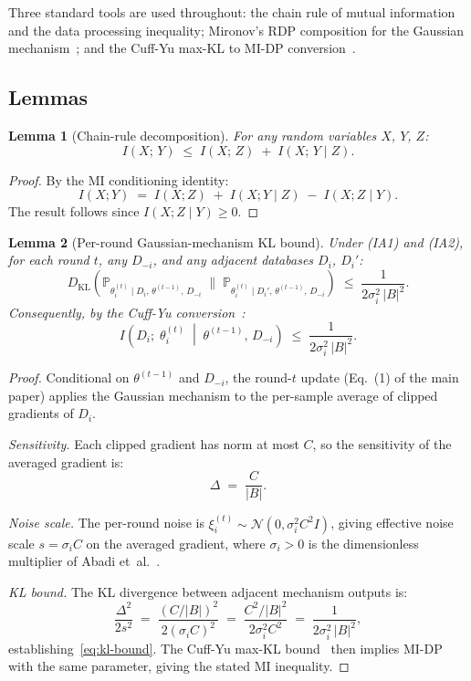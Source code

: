 \documentclass[letterpaper,journal]{IEEEtran}
\newtheorem{lemma}{Lemma}[section]
\newcommand{\KL}{D_{\mathrm{KL}}}
\begin{document}
\noindent Three standard tools are used throughout: the chain rule of
mutual information and the data processing inequality;
Mironov's RDP composition for the Gaussian
mechanism~\cite{mironov2017rdp}; and the Cuff-Yu max-KL to
MI-DP conversion~\cite{cuff2016mi}.

\subsection{Lemmas}

\begin{lemma}[Chain-rule decomposition]
\label{lem:chain}
For any random variables $X$, $Y$, $Z$:
\[
I(X;\,Y) \;\leq\; I(X;\,Z) \;+\; I(X;\,Y \mid Z).
\]
\end{lemma}

\begin{proof}
By the MI conditioning identity:
\[
I(X;Y) \;=\; I(X;Z) \;+\; I(X;Y \mid Z) \;-\; I(X;Z \mid Y).
\]
The result follows since $I(X;Z \mid Y) \geq 0$.
\end{proof}

\begin{lemma}[Per-round Gaussian-mechanism KL bound]
\label{lem:perround}
Under (IA1) and (IA2), for each round $t$, any $D_{-i}$, and
any adjacent databases $D_i$, $D_i'$:
\begin{equation}
\KL\!\left(
\mathbb{P}_{\theta_i^{(t)} \mid D_i,\, \theta^{(t-1)},\, D_{-i}}
\;\Big\|\;
\mathbb{P}_{\theta_i^{(t)} \mid D_i',\, \theta^{(t-1)},\,
D_{-i}}\right)
\;\leq\;
\frac{1}{2\sigma_i^2\,|B|^2}.
\label{eq:kl-bound}
\end{equation}
Consequently, by the Cuff-Yu conversion~\cite{cuff2016mi}:
\[
I\!\left(D_i;\;\theta_i^{(t)} \;\middle|\;
\theta^{(t-1)},\,D_{-i}\right)
\;\leq\; \frac{1}{2\sigma_i^2\,|B|^2}.
\]
\end{lemma}

\begin{proof}
Conditional on $\theta^{(t-1)}$ and $D_{-i}$, the round-$t$
update (Eq.~(1) of the main paper) applies the Gaussian
mechanism to the per-sample average of clipped gradients
of $D_i$.

\medskip
\noindent\textit{Sensitivity.} Each clipped gradient has norm
at most $C$, so the sensitivity of the averaged gradient is:
\[
\Delta \;=\; \frac{C}{|B|}.
\]

\noindent\textit{Noise scale.} The per-round noise is
$\xi_i^{(t)} \sim \mathcal{N}(0, \sigma_i^2 C^2 I)$, giving
effective noise scale $s = \sigma_i C$ on the averaged gradient,
where $\sigma_i > 0$ is the dimensionless multiplier of Abadi
et~al.~\cite{abadi2016dpsgd}.

\medskip
\noindent\textit{KL bound.} The KL divergence between adjacent
mechanism outputs is:
\[
\frac{\Delta^2}{2s^2}
\;=\; \frac{(C/|B|)^2}{2(\sigma_i C)^2}
\;=\; \frac{C^2/|B|^2}{2\sigma_i^2 C^2}
\;=\; \frac{1}{2\sigma_i^2\,|B|^2},
\]
establishing~\eqref{eq:kl-bound}. The Cuff-Yu max-KL
bound~\cite{cuff2016mi} then implies MI-DP with the same
parameter, giving the stated MI inequality.
\end{proof}
\end{document}
